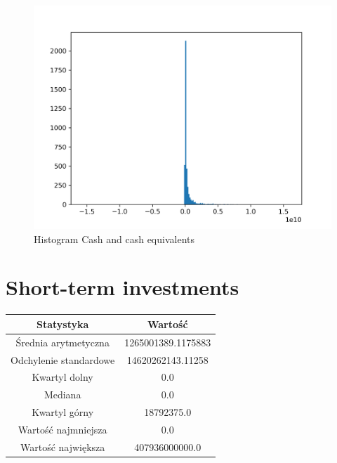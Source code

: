 \documentclass{article}
\begin{document}
\begin{figure}[h!]
    \includegraphics[width=\linewidth]{variables/Cash and cash equivalents.png}
    \caption{Histogram Cash and cash equivalents }
\end{figure}\section{ Short-term investments }

\begin{center}
    \begin{tabular}{|c | c|} 
    \hline
    Statystyka & Wartość \\
    \hline\hline
    Średnia arytmetyczna & 1265001389.1175883 \\ 
    \hline
    Odchylenie standardowe & 14620262143.11258 \\
    \hline
    Kwartyl dolny & 0.0 \\
    \hline
    Mediana & 0.0 \\
    \hline
    Kwartyl górny & 18792375.0 \\
    \hline
    Wartość najmniejsza & 0.0 \\
    \hline
    Wartość największa & 407936000000.0 \\
    \hline
   \end{tabular}
\end{center}
\end{document}
